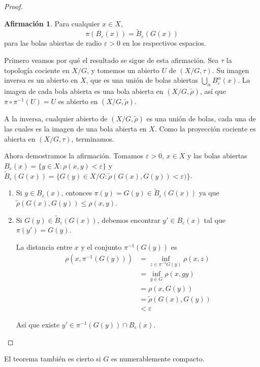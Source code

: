 \documentclass[spanish]{article}
\theoremstyle{definition}
\newtheorem*{af}{Afirmación}
\begin{document}
\begin{proof}
	\begin{af}
		Para cualquier $x\in X$,
		\[\pi(B_\varepsilon(x))=\tilde{B}_\varepsilon(G(x))\]
		para las bolas abiertas de radio $\varepsilon>0$ en los respectivos espacios.
	\end{af}
	
	Primero veamos por qué el resultado se sigue de esta afirmación. Sea $\tau$ la topología cociente en $X/G$, y tomemos un abierto $U$ de $(X/G,\tau)$. Su imagen inversa es un abierto en $X$, que es una unión de bolas abiertas $\bigcup_\alpha B^\alpha_\varepsilon(x)$. La imagen de cada bola abierta es una bola abierta en $(X/G,\tilde{\rho})$, así que $\pi\circ\pi^{-1}(U)=U$ es abierto en $(X/G,\tilde{\rho})$.
	
	A la inversa, cualquier abierto de $(X/G,\tilde{\rho})$ es una unión de bolas, cada una de las cuales es la imagen de una bola abierta en $X$. Como la proyección cociente es abierta en $(X/G,\tau)$, terminamos.
	 
	Ahora demostramos la afirmación. Tomamos $\varepsilon>0$, $x\in X$ y las bolas abiertas\linebreak
	${B_\varepsilon(x)=\{y\in X:\rho(x,y)<\varepsilon\}}$ y $\tilde{B}_\varepsilon(G(x))=\{G(y)\in X/G:\tilde{\rho}(G(x),G(y))<\varepsilon)\}$.
	
	\begin{enumerate}
		\item[$(\subseteq)$] Si $y\in B_\varepsilon(x)$, entonces $\pi(y)=G(y)\in\tilde{B}_\varepsilon(G(x))$ ya que $\tilde{\rho}(G(x),G(y))\leq\rho(x,y)$.
	
	
		\item[$(\supseteq)$] Si $G(y)\in\tilde{B}_\varepsilon(G(x))$, debemos encontrar $y'\in B_\varepsilon(x)$ tal que $\pi(y')=G(y)$.
	
	La distancia entre $x$ y el conjunto $\pi^{-1}(G(y))$ es
	\begin{align*}
		\rho(x,\pi^{-1}(G(y)))&=\inf_{z\in\pi^{-1}G(y)}\rho(x,z)\\
		&=\inf_{g\in G}\rho(x,gy)\\
		&=\rho(x,G(y))\\
		&=\tilde{\rho}(G(x),G(y))\\
		&<\varepsilon
	\end{align*}
	
	Así que existe $y'\in\pi^{-1}(G(y))\cap B_\varepsilon(x)$.
	\end{enumerate}
\end{proof}
El teorema también es cierto si $G$ es numerablemente compacto.
\end{document}

